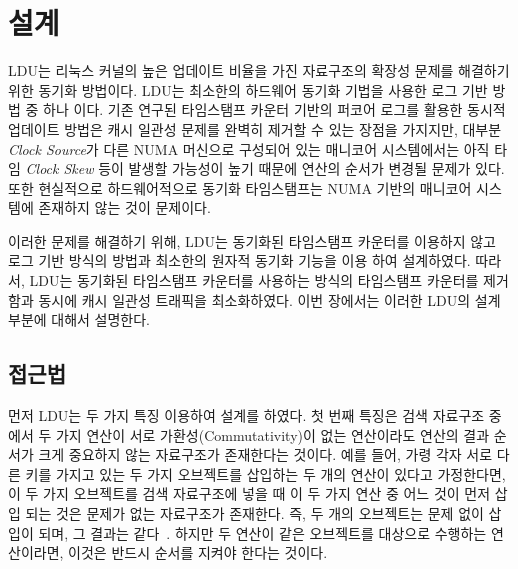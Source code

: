 \section{설계}
\label{sec:ldu}

LDU는 리눅스 커널의 높은 업데이트 비율을 가진 자료구조의 확장성 문제를 해결하기 위한 동기화 방법이다.
LDU는 최소한의 하드웨어 동기화 기법을 사용한 로그 기반 방법 중 하나 이다.
기존 연구된 타임스탬프 카운터 기반의 퍼코어 로그를 활용한 동시적 업데이트 방법은 
캐시 일관성 문제를 완벽히 제거할 수 있는 장점을 가지지만, 
대부분 \textit{Clock Source}가 다른 NUMA 머신으로 구성되어 있는 매니코어 시스템에서는 
아직 타임 \textit{Clock Skew} 등이 발생할 가능성이 높기 때문에 연산의 순서가 변경될 문제가 있다.
또한 현실적으로 하드웨어적으로 동기화 타임스탬프는 NUMA 기반의 매니코어 시스템에 존재하지 않는 것이 문제이다.

이러한 문제를 해결하기 위해, LDU는 동기화된 타임스탬프 카운터를 이용하지 않고 로그 기반 방식의 
방법과 최소한의 원자적 동기화 기능을 이용 하여 설계하였다.
따라서, LDU는 동기화된 타임스탬프 카운터를 사용하는 방식의 타임스탬프 카운터를 
제거함과 동시에 캐시 일관성 트래픽을 최소화하였다.
이번 장에서는 이러한 LDU의 설계 부분에 대해서 설명한다. 

\subsection{접근법}
먼저 LDU는 두 가지 특징 이용하여 설계를 하였다. 
첫 번째 특징은 검색 자료구조 중에서 두 가지 연산이 서로 가환성(Commutativity)이 없는 연산이라도 
연산의 결과 순서가 크게 중요하지 않는 자료구조가 존재한다는 것이다. 
예를 들어, 가령 각자 서로 다른 키를 가지고 있는 두 가지 오브젝트를 삽입하는 두 개의 
연산이 있다고 가정한다면, 이 두 가지 오브젝트를 검색 자료구조에 넣을 때 이 두 가지 연산 중 
어느 것이 먼저 삽입 되는 것은 문제가 없는 자료구조가 존재한다.  
즉, 두 개의 오브젝트는 문제 없이 삽입이 되며, 그 결과는 같다~\cite{PaulCreatingAPILWN}. 
하지만 두 연산이 같은 오브젝트를 대상으로 수행하는 연산이라면, 이것은 반드시 
순서를 지켜야 한다는 것이다.  

